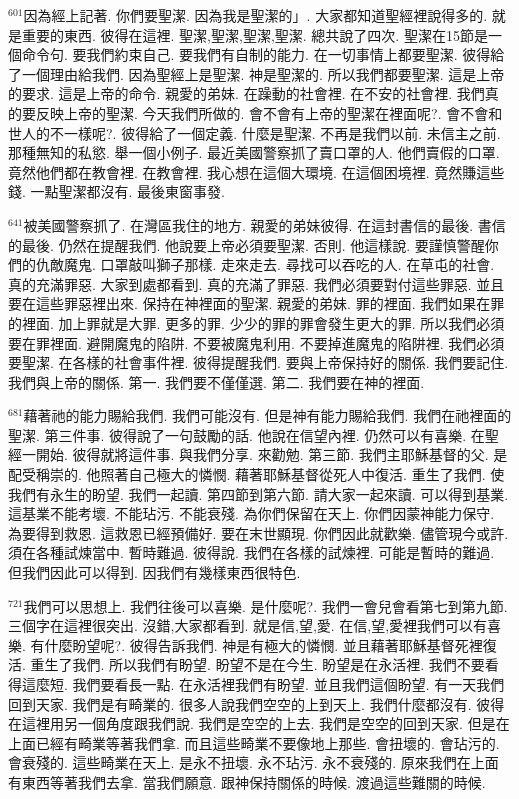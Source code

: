 \documentclass{book}
\begin{document}
$^{601}$因為經上記著.
你們要聖潔.
因為我是聖潔的」.
大家都知道聖經裡說得多的.
就是重要的東西.
彼得在這裡.
聖潔,聖潔,聖潔,聖潔.
總共說了四次.
聖潔在15節是一個命令句.
要我們約束自己.
要我們有自制的能力.
在一切事情上都要聖潔.
彼得給了一個理由給我們.
因為聖經上是聖潔.
神是聖潔的.
所以我們都要聖潔.
這是上帝的要求.
這是上帝的命令.
親愛的弟妹.
在躁動的社會裡.
在不安的社會裡.
我們真的要反映上帝的聖潔.
今天我們所做的.
會不會有上帝的聖潔在裡面呢?.
會不會和世人的不一樣呢?.
彼得給了一個定義.
什麼是聖潔.
不再是我們以前.
未信主之前.
那種無知的私慾.
舉一個小例子.
最近美國警察抓了賣口罩的人.
他們賣假的口罩.
竟然他們都在教會裡.
在教會裡.
我心想在這個大環境.
在這個困境裡.
竟然賺這些錢.
一點聖潔都沒有.
最後東窗事發.

$^{641}$被美國警察抓了.
在灣區我住的地方.
親愛的弟妹彼得.
在這封書信的最後.
書信的最後.
仍然在提醒我們.
他說要上帝必須要聖潔.
否則.
他這樣說.
要謹慎警醒你們的仇敵魔鬼.
口罩敲叫獅子那樣.
走來走去.
尋找可以吞吃的人.
在草屯的社會.
真的充滿罪惡.
大家到處都看到.
真的充滿了罪惡.
我們必須要對付這些罪惡.
並且要在這些罪惡裡出來.
保持在神裡面的聖潔.
親愛的弟妹.
罪的裡面.
我們如果在罪的裡面.
加上罪就是大罪.
更多的罪.
少少的罪的罪會發生更大的罪.
所以我們必須要在罪裡面.
避開魔鬼的陷阱.
不要被魔鬼利用.
不要掉進魔鬼的陷阱裡.
我們必須要聖潔.
在各樣的社會事件裡.
彼得提醒我們.
要與上帝保持好的關係.
我們要記住.
我們與上帝的關係.
第一.
我們要不僅僅選.
第二.
我們要在神的裡面.

$^{681}$藉著祂的能力賜給我們.
我們可能沒有.
但是神有能力賜給我們.
我們在祂裡面的聖潔.
第三件事.
彼得說了一句鼓勵的話.
他說在信望內裡.
仍然可以有喜樂.
在聖經一開始.
彼得就將這件事.
與我們分享.
來勸勉.
第三節.
我們主耶穌基督的父.
是配受稱崇的.
他照著自己極大的憐憫.
藉著耶穌基督從死人中復活.
重生了我們.
使我們有永生的盼望.
我們一起讀.
第四節到第六節.
請大家一起來讀.
可以得到基業.
這基業不能考壞.
不能玷污.
不能衰殘.
為你們保留在天上.
你們因蒙神能力保守.
為要得到救恩.
這救恩已經預備好.
要在末世顯現.
你們因此就歡樂.
儘管現今或許.
須在各種試煉當中.
暫時難過.
彼得說.
我們在各樣的試煉裡.
可能是暫時的難過.
但我們因此可以得到.
因我們有幾樣東西很特色.

$^{721}$我們可以思想上.
我們往後可以喜樂.
是什麼呢?.
我們一會兒會看第七到第九節.
三個字在這裡很突出.
沒錯,大家都看到.
就是信,望,愛.
在信,望,愛裡我們可以有喜樂.
有什麼盼望呢?.
彼得告訴我們.
神是有極大的憐憫.
並且藉著耶穌基督死裡復活.
重生了我們.
所以我們有盼望.
盼望不是在今生.
盼望是在永活裡.
我們不要看得這麼短.
我們要看長一點.
在永活裡我們有盼望.
並且我們這個盼望.
有一天我們回到天家.
我們是有畸業的.
很多人說我們空空的上到天上.
我們什麼都沒有.
彼得在這裡用另一個角度跟我們說.
我們是空空的上去.
我們是空空的回到天家.
但是在上面已經有畸業等著我們拿.
而且這些畸業不要像地上那些.
會扭壞的.
會玷污的.
會衰殘的.
這些畸業在天上.
是永不扭壞.
永不玷污.
永不衰殘的.
原來我們在上面有東西等著我們去拿.
當我們願意.
跟神保持關係的時候.
渡過這些難關的時候.
\end{document}
